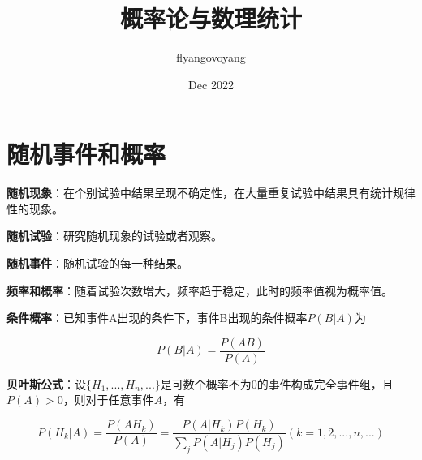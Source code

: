 \documentclass[11pt]{article}
\title{概率论与数理统计}
\author{flyangovoyang}
\date{Dec 2022}
\begin{document}
\maketitle

\begin{abstract}

\end{abstract}

\section{随机事件和概率}

\textbf{随机现象}：在个别试验中结果呈现不确定性，在大量重复试验中结果具有统计规律性的现象。

\textbf{随机试验}：研究随机现象的试验或者观察。

\textbf{随机事件}：随机试验的每一种结果。

\textbf{频率和概率}：随着试验次数增大，频率趋于稳定，此时的频率值视为概率值。

\textbf{条件概率}：已知事件A出现的条件下，事件B出现的条件概率$P(B|A)$为

\begin{equation}\label{key}
	P(B|A) = \frac{P(AB)}{P(A)}
\end{equation}

\textbf{贝叶斯公式}：设$\{H_1, ..., H_n, ...\}$是可数个概率不为0的事件构成完全事件组，且$P(A)>0$，则对于任意事件$A$，有

\begin{equation}\label{key}
	P(H_k|A) = \frac{P(AH_k)}{P(A)} = \frac{P(A|H_k)P(H_k)}{\sum_jP(A|H_j)P(H_j)} (k=1, 2, ..., n, ...)
\end{equation}
\end{document}
